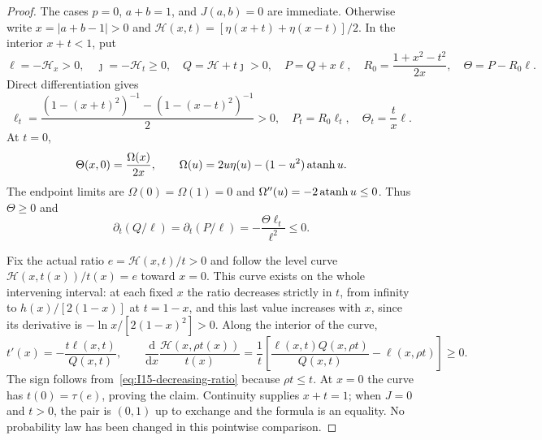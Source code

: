 \documentclass[11pt]{article}
\theoremstyle{remark}\newtheorem{remark}[theorem]{Remark}
\numberwithin{equation}{section}
\begin{document}
\begin{proof}
The cases $p=0$, $a+b=1$, and $J(a,b)=0$ are immediate. Otherwise write
$x=|a+b-1|>0$ and $\mathcal H(x,t)=[\eta(x+t)+\eta(x-t)]/2$.
In the interior $x+t<1$, put
\[
 \ell=-\mathcal H_x>0,\quad \jmath=-\mathcal H_t\ge0,\quad
 Q=\mathcal H+t\jmath>0,\quad P=Q+x\ell,\quad
 R_0=\frac{1+x^2-t^2}{2x},\quad \Theta=P-R_0\ell.
\]
Direct differentiation gives
\begin{equation}\label{eq:I15-ratio-calculus}
 \ell_t=\frac{(1-(x+t)^2)^{-1}-(1-(x-t)^2)^{-1}}2>0,
 \quad P_t=R_0\ell_t,\quad \Theta_t=\frac tx\ell.
\end{equation}
At $t=0$,
\[
 \Theta(x,0)=\frac{\Omega(x)}{2x},\qquad
 \Omega(u)=2u\eta(u)-(1-u^2)\operatorname{atanh} u.
\]
The endpoint limits are $\Omega(0)=\Omega(1)=0$ and
$\Omega''(u)=-2\operatorname{atanh} u\le0$. Thus $\Theta\ge0$ and
\begin{equation}\label{eq:I15-decreasing-ratio}
 \partial_t(Q/\ell)=\partial_t(P/\ell)
   =-\frac{\Theta\ell_t}{\ell^2}\le0.
\end{equation}

Fix the actual ratio $e=\mathcal H(x,t)/t>0$ and follow the level curve
$\mathcal H(x,t(x))/t(x)=e$ toward $x=0$.
This curve exists on the whole intervening interval: at each fixed $x$ the
ratio decreases strictly in $t$, from infinity to
$h(x)/[2(1-x)]$ at $t=1-x$, and this last value increases with $x$, since
its derivative is $-\ln x/[2(1-x)^2]>0$.
Along the interior of the curve,
\begin{equation}\label{eq:I15-level-derivative}
 t'(x)=-\frac{t\ell(x,t)}{Q(x,t)},\qquad
 \frac{\mathrm d}{\mathrm dx}\frac{\mathcal H(x,\rho t(x))}{t(x)}
 =\frac1t\left[
 \frac{\ell(x,t)Q(x,\rho t)}{Q(x,t)}-\ell(x,\rho t)\right]\ge0.
\end{equation}
The sign follows from~\eqref{eq:I15-decreasing-ratio} because $\rho t\le t$.
At $x=0$ the curve has $t(0)=\tau(e)$, proving the claim.
Continuity supplies $x+t=1$; when $J=0$ and $t>0$, the pair is $(0,1)$
up to exchange and the formula is an equality. No probability law has
been changed in this pointwise comparison.
\end{proof}
\end{document}
